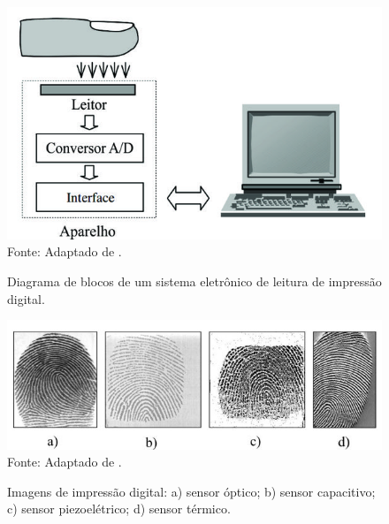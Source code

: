   \begin{figure}[!b]
  \begin{center}
  \caption{Diagrama de blocos de um sistema eletrônico de leitura de impressão digital.}
  \includegraphics[scale=0.6]{figuras/cap2/leitor_bio.jpg}\\
  Fonte: Adaptado de \cite{maltoni2009handbook}.
  \label{leitor_bio}
  \end{center}
  \end{figure}


  \begin{figure}[!t]
  \begin{center}
  \caption{Imagens de impressão digital: a) sensor óptico; b) sensor capacitivo; c) sensor piezoelétrico; d) sensor térmico.}
  \includegraphics[scale=0.75]{figuras/cap2/tipos_sensores.jpg}\\
  Fonte: Adaptado de \cite{maltoni2009handbook}.
  \label{tipos_sensores}
  \end{center}
  \end{figure}


